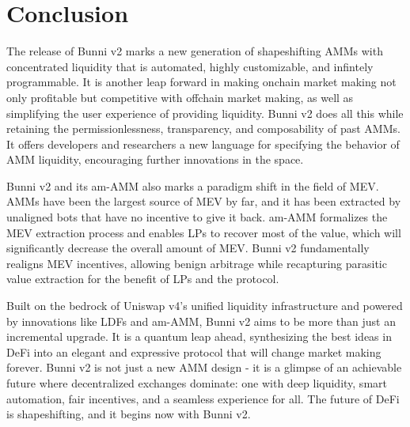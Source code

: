 \documentclass[twocolumn]{article}
\begin{document}
\section{Conclusion}

The release of Bunni v2 marks a new generation of shapeshifting AMMs with concentrated liquidity that is automated, highly customizable, and infintely programmable. It is another leap forward in making onchain market making not only profitable but competitive with offchain market making, as well as simplifying the user experience of providing liquidity. Bunni v2 does all this while retaining the permissionlessness, transparency, and composability of past AMMs. It offers developers and researchers a new language for specifying the behavior of AMM liquidity, encouraging further innovations in the space.

Bunni v2 and its am-AMM also marks a paradigm shift in the field of MEV. AMMs have been the largest source of MEV by far, and it has been extracted by unaligned bots that have no incentive to give it back. am-AMM formalizes the MEV extraction process and enables LPs to recover most of the value, which will significantly decrease the overall amount of MEV. Bunni v2 fundamentally realigns MEV incentives, allowing benign arbitrage while recapturing parasitic value extraction for the benefit of LPs and the protocol.

Built on the bedrock of Uniswap v4's unified liquidity infrastructure and powered by innovations like LDFs and am-AMM, Bunni v2 aims to be more than just an incremental upgrade. It is a quantum leap ahead, synthesizing the best ideas in DeFi into an elegant and expressive protocol that will change market making forever. Bunni v2 is not just a new AMM design - it is a glimpse of an achievable future where decentralized exchanges dominate: one with deep liquidity, smart automation, fair incentives, and a seamless experience for all. The future of DeFi is shapeshifting, and it begins now with Bunni v2.

\printbibliography
\end{document}
